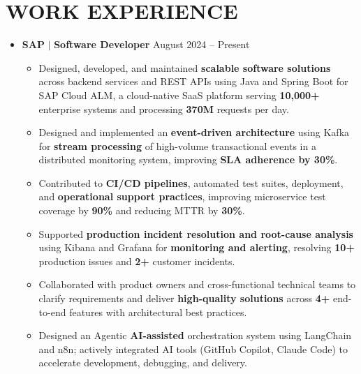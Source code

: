 \documentclass[a4paper,11pt]{article}
\begin{document}
\section{WORK EXPERIENCE}
\begin{itemize}[leftmargin=0in, label={}]
  \item
    \textbf{SAP }$|$\textbf{ Software Developer} \hfill \small{August 2024 -- Present} \\
    \begin{itemize}[leftmargin=0.18in, itemsep=0.5pt, topsep=1pt]
      \item \small{Designed, developed, and maintained \textbf{scalable software solutions} across backend services and REST APIs using Java and Spring Boot for SAP Cloud ALM, a cloud-native SaaS platform serving \textbf{10,000+} enterprise systems and processing \textbf{370M} requests per day.}
      \item \small{Designed and implemented an \textbf{event-driven architecture} using Kafka for \textbf{stream processing} of high-volume transactional events in a distributed monitoring system, improving \textbf{SLA adherence by 30\%}.}
      \item \small{Contributed to \textbf{CI/CD pipelines}, automated test suites, deployment, and \textbf{operational support practices}, improving microservice test coverage by \textbf{90\%} and reducing MTTR by \textbf{30\%}.}
      \item \small{Supported \textbf{production incident resolution and root-cause analysis} using Kibana and Grafana for \textbf{monitoring and alerting}, resolving \textbf{10+} production issues and \textbf{2+} customer incidents.}
      \item \small{Collaborated with product owners and cross-functional technical teams to clarify requirements and deliver \textbf{high-quality solutions} across \textbf{4+} end-to-end features with architectural best practices.}
      \item \small{Designed an Agentic \textbf{AI-assisted} orchestration system using LangChain and n8n; actively integrated AI tools (GitHub Copilot, Claude Code) to accelerate development, debugging, and delivery.}
    \end{itemize}
\end{itemize}


\end{document}
